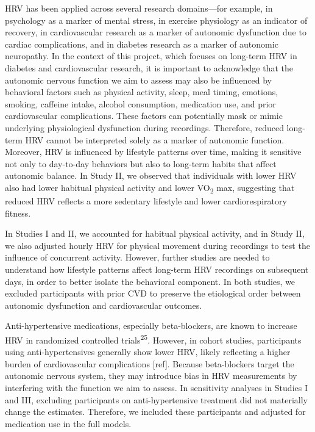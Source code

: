 \documentclass[
  a4paper,
  headsepline=true,
  open=any]{scrbook}
\begin{document}
HRV has been applied across several research domains---for example, in
psychology as a marker of mental stress, in exercise physiology as an
indicator of recovery, in cardiovascular research as a marker of
autonomic dysfunction due to cardiac complications, and in diabetes
research as a marker of autonomic neuropathy. In the context of this
project, which focuses on long-term HRV in diabetes and cardiovascular
research, it is important to acknowledge that the autonomic nervous
function we aim to assess may also be influenced by behavioral factors
such as physical activity, sleep, meal timing, emotions, smoking,
caffeine intake, alcohol consumption, medication use, and prior
cardiovascular complications. These factors can potentially mask or
mimic underlying physiological dysfunction during recordings. Therefore,
reduced long-term HRV cannot be interpreted solely as a marker of
autonomic function. Moreover, HRV is influenced by lifestyle patterns
over time, making it sensitive not only to day-to-day behaviors but also
to long-term habits that affect autonomic balance. In Study II, we
observed that individuals with lower HRV also had lower habitual
physical activity and lower VO\textsubscript{2} max, suggesting that
reduced HRV reflects a more sedentary lifestyle and lower
cardiorespiratory fitness.

In Studies I and II, we accounted for habitual physical activity, and in
Study II, we also adjusted hourly HRV for physical movement during
recordings to test the influence of concurrent activity. However,
further studies are needed to understand how lifestyle patterns affect
long-term HRV recordings on subsequent days, in order to better isolate
the behavioral component. In both studies, we excluded participants with
prior CVD to preserve the etiological order between autonomic
dysfunction and cardiovascular outcomes.

Anti-hypertensive medications, especially beta-blockers, are known to
increase HRV in randomized controlled trials\textsuperscript{25}.
However, in cohort studies, participants using anti-hypertensives
generally show lower HRV, likely reflecting a higher burden of
cardiovascular complications {[}ref{]}. Because beta-blockers target the
autonomic nervous system, they may introduce bias in HRV measurements by
interfering with the function we aim to assess. In sensitivity analyses
in Studies I and III, excluding participants on anti-hypertensive
treatment did not materially change the estimates. Therefore, we
included these participants and adjusted for medication use in the full
models.
\end{document}

